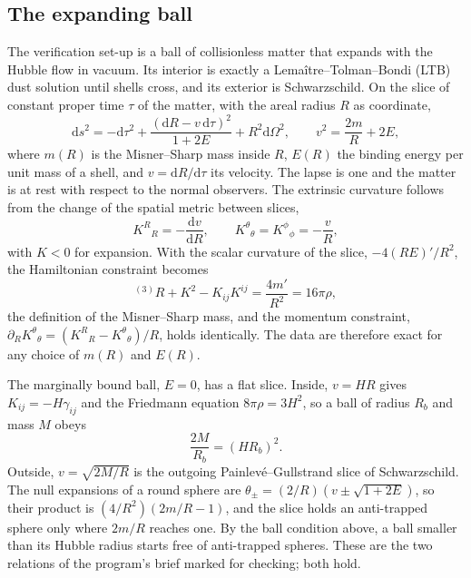 \documentclass[aps,prd,twocolumn,10pt,superscriptaddress,nofootinbib,longbibliography,floatfix]{revtex4-2}
\newcommand{\dd}{\mathrm{d}}
\begin{document}
\subsection{The expanding ball}\label{sec:ball}

The verification set-up is a ball of collisionless matter that expands with the Hubble flow in vacuum. Its interior is exactly a Lema\^itre--Tolman--Bondi (LTB) dust solution until shells cross, and its exterior is Schwarzschild. On the slice of constant proper time $\tau$ of the matter, with the areal radius $R$ as coordinate,
\begin{equation}\label{eq:ltb}
\dd s^2 = -\dd\tau^2 + \frac{(\dd R - v\,\dd\tau)^2}{1+2E} + R^2\dd\Omega^2,\qquad v^2 = \frac{2m}{R}+2E,
\end{equation}
where $m(R)$ is the Misner--Sharp mass inside $R$, $E(R)$ the binding energy per unit mass of a shell, and $v=\dd R/\dd\tau$ its velocity. The lapse is one and the matter is at rest with respect to the normal observers. The extrinsic curvature follows from the change of the spatial metric between slices,
\begin{equation}\label{eq:kij}
K^R{}_R = -\frac{\dd v}{\dd R},\qquad K^\theta{}_\theta = K^\phi{}_\phi = -\frac{v}{R},
\end{equation}
with $K<0$ for expansion. With the scalar curvature of the slice, $-4(RE)'/R^2$, the Hamiltonian constraint becomes
\begin{equation}\label{eq:ham}
{}^{(3)}\!R + K^2 - K_{ij}K^{ij} = \frac{4m'}{R^2} = 16\pi\rho,
\end{equation}
the definition of the Misner--Sharp mass, and the momentum constraint, $\partial_R K^\theta{}_\theta = (K^R{}_R-K^\theta{}_\theta)/R$, holds identically. The data are therefore exact for any choice of $m(R)$ and $E(R)$.

The marginally bound ball, $E=0$, has a flat slice. Inside, $v=HR$ gives $K_{ij}=-H\gamma_{ij}$ and the Friedmann equation $8\pi\rho=3H^2$, so a ball of radius $R_b$ and mass $M$ obeys
\begin{equation}\label{eq:ballcondition}
\frac{2M}{R_b} = (HR_b)^2 .
\end{equation}
Outside, $v=\sqrt{2M/R}$ is the outgoing Painlev\'e--Gullstrand slice of Schwarzschild. The null expansions of a round sphere are $\theta_\pm=(2/R)(v\pm\sqrt{1+2E})$, so their product is $(4/R^2)(2m/R-1)$, and the slice holds an anti-trapped sphere only where $2m/R$ reaches one. By the ball condition above, a ball smaller than its Hubble radius starts free of anti-trapped spheres. These are the two relations of the program's brief marked for checking; both hold.
\end{document}
